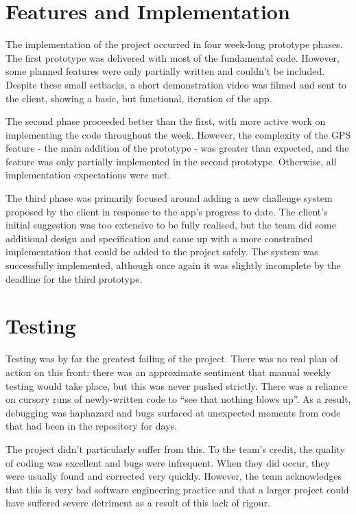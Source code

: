 \documentclass[12pt,a4paper,twoside]{article}
\begin{document}
\section{Features and Implementation}

The implementation of the project occurred in four week-long prototype phases. 
The first prototype was delivered with most of the fundamental code. 
However, some planned features were only partially written and couldn't be included. 
Despite these small setbacks, a short demonstration video was filmed and sent to the client, showing a basic, but functional, iteration of the app.

The second phase proceeded better than the first, with more active work on implementing the code throughout the week. 
However, the complexity of the GPS feature - the main addition of the prototype - was greater than expected, and the feature was only partially implemented in the second prototype. 
Otherwise, all implementation expectations were met.

The third phase was primarily focused around adding a new challenge system proposed by the client in response to the app's progress to date. 
The client's initial suggestion was too extensive to be fully realised, but the team did some additional design and specification and came up with a more constrained implementation that could be added to the project safely. 
The system was successfully implemented, although once again it was slightly incomplete by the deadline for the third prototype.

\section{Testing}

Testing was by far the greatest failing of the project. 
There was no real plan of action on this front: there was an approximate sentiment that manual weekly testing would take place, but this was never pushed strictly. 
There was a reliance on cursory runs of newly-written code to ``see that nothing blows up''. 
As a result, debugging was haphazard and bugs surfaced at unexpected moments from code that had been in the repository for days.

The project didn't particularly suffer from this. 
To the team's credit, the quality of coding was excellent and bugs were infrequent. 
When they did occur, they were usually found and corrected very quickly. 
However, the team acknowledges that this is very bad software engineering practice and that a larger project could have suffered severe detriment as a result of this lack of rigour.
\end{document}
